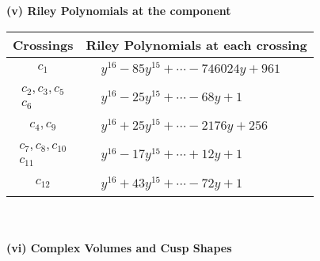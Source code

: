 \documentclass[1p]{elsarticle_modified}
\theoremstyle{definition}
\begin{document}
\newpage\renewcommand{\arraystretch}{1}
\flushleft \textbf{(v) Riley Polynomials at the component}\newline \\
\begin{tabular}{m{50pt}|m{274pt}}
Crossings & \hspace{64pt}Riley Polynomials at each crossing \\
\hline $$\begin{aligned}c_{1}\end{aligned}$$&$\begin{aligned}
&y^{16}-85 y^{15}+\cdots-746024 y+961
\end{aligned}$\\
\hline $$\begin{aligned}c_{2},c_{3},c_{5}\\c_{6}\end{aligned}$$&$\begin{aligned}
&y^{16}-25 y^{15}+\cdots-68 y+1
\end{aligned}$\\
\hline $$\begin{aligned}c_{4},c_{9}\end{aligned}$$&$\begin{aligned}
&y^{16}+25 y^{15}+\cdots-2176 y+256
\end{aligned}$\\
\hline $$\begin{aligned}c_{7},c_{8},c_{10}\\c_{11}\end{aligned}$$&$\begin{aligned}
&y^{16}-17 y^{15}+\cdots+12 y+1
\end{aligned}$\\
\hline $$\begin{aligned}c_{12}\end{aligned}$$&$\begin{aligned}
&y^{16}+43 y^{15}+\cdots-72 y+1
\end{aligned}$\\
\hline
\end{tabular}\\~\\
\newpage\flushleft \textbf{(vi) Complex Volumes and Cusp Shapes}
\end{document}
